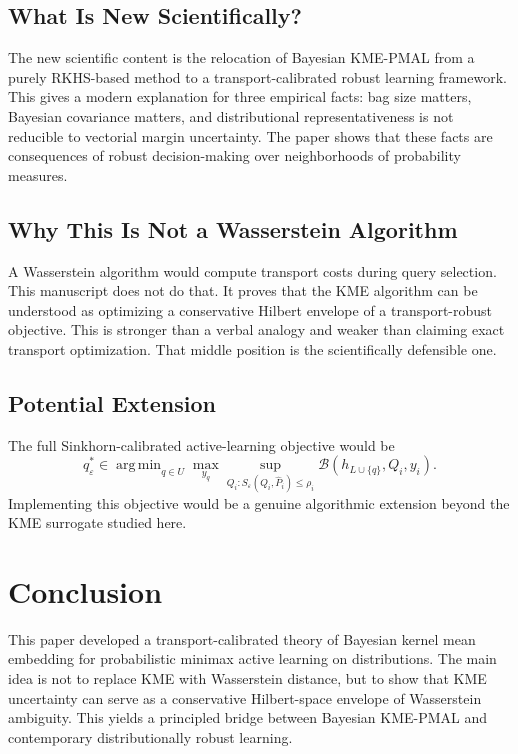 \documentclass[10pt,journal]{IEEEtran}
\DeclareMathOperator*{\argmin}{arg\,min}
\newcommand{\eps}{\varepsilon}
\newcommand{\wh}{\widehat}
\begin{document}
\subsection{What Is New Scientifically?}

The new scientific content is the relocation of Bayesian KME-PMAL from a purely RKHS-based method to a transport-calibrated robust learning framework. This gives a modern explanation for three empirical facts: bag size matters, Bayesian covariance matters, and distributional representativeness is not reducible to vectorial margin uncertainty. The paper shows that these facts are consequences of robust decision-making over neighborhoods of probability measures.

\subsection{Why This Is Not a Wasserstein Algorithm}

A Wasserstein algorithm would compute transport costs during query selection. This manuscript does not do that. It proves that the KME algorithm can be understood as optimizing a conservative Hilbert envelope of a transport-robust objective. This is stronger than a verbal analogy and weaker than claiming exact transport optimization. That middle position is the scientifically defensible one.

\subsection{Potential Extension}

The full Sinkhorn-calibrated active-learning objective would be
\begin{equation}
    q^*_{\eps}\in\argmin_{q\in U}\max_{y_q}\sup_{Q_i:S_\eps(Q_i,\wh P_i)\le \rho_i}\mathcal{B}(h_{L\cup\{q\}},Q_i,y_i).
\end{equation}
Implementing this objective would be a genuine algorithmic extension beyond the KME surrogate studied here.

\section{Conclusion}
\label{sec:conclusion}

This paper developed a transport-calibrated theory of Bayesian kernel mean embedding for probabilistic minimax active learning on distributions. The main idea is not to replace KME with Wasserstein distance, but to show that KME uncertainty can serve as a conservative Hilbert-space envelope of Wasserstein ambiguity. This yields a principled bridge between Bayesian KME-PMAL and contemporary distributionally robust learning.
\end{document}
